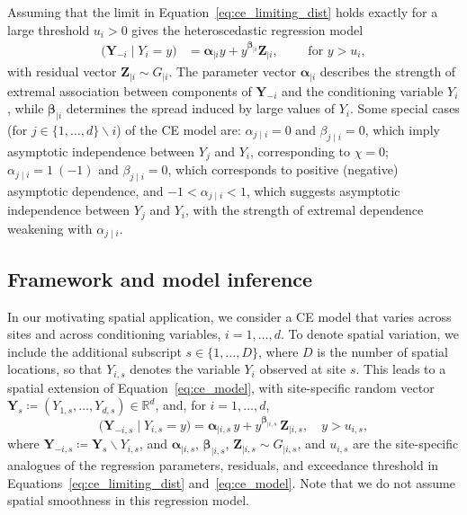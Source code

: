 \documentclass[preprint,12pt,authoryear]{elsarticle}
\begin{document}
Assuming that the limit in Equation~\eqref{eq:ce_limiting_dist} holds exactly for a large threshold $u_i > 0$ gives the heteroscedastic regression model
\begin{align}\label{eq:ce_model}
\bigl(\boldsymbol{Y}_{-i} \mid Y_i = y \bigr) &= \boldsymbol{\alpha}_{\mid i}y + y^{\boldsymbol{\beta}_{\mid i}}\boldsymbol{Z}_{\mid i},\qquad \text{ for } y > u_i,
\end{align}
with residual vector $\boldsymbol{Z}_{\mid i} \sim G_{\mid i}$.
The parameter vector $\boldsymbol{\alpha}_{\mid i}$ describes the strength of extremal association between components of $\boldsymbol{Y}_{-i}$ and the conditioning variable $Y_i$, while $\boldsymbol{\beta}_{\mid i}$ determines the spread induced by large values of $Y_i$. 
Some special cases (for $j\in\{1,\ldots,d\} \backslash i$) of the CE model are:
$\alpha_{j\mid i}=0$ and $\beta_{j\mid i}=0$, which imply asymptotic independence between $Y_j$ and $Y_i$, corresponding to $\chi=0$;
$\alpha_{j\mid i}=1\ ( -1)$ and $\beta_{j\mid i}=0$, which corresponds to positive (negative) asymptotic dependence, and
$-1<\alpha_{j\mid i}<1$, which suggests asymptotic independence between $Y_j$ and $Y_i$, with the strength of extremal dependence weakening with $\alpha_{j \mid i}$. 

\subsection{Framework and model inference}
\label{subsec:ce_setup}

In our motivating spatial application, we consider a CE model that varies across sites and across conditioning variables, $i = 1, \ldots, d$.
To denote spatial variation, we include the additional subscript $s \in \{1, \ldots, D\}$, where $D$ is the number of spatial locations, so that $Y_{i,s}$ denotes the variable $Y_i$ observed at site $s$.
This leads to a spatial extension of Equation~\eqref{eq:ce_model}, with site-specific random vector $\boldsymbol{Y}_{s} \coloneq \left(Y_{1,s}, \ldots, Y_{d,s}\right) \in \mathbb{R}^d$, and, for $i = 1, \ldots, d$,
\begin{equation} \label{eq:ce_model_spat}
  \bigl(\boldsymbol{Y}_{-i, s} \mid Y_{i, s} = y\bigr) 
    = \boldsymbol{\alpha}_{\mid i, s} \, y 
      + y^{\boldsymbol{\beta}_{\mid i, s}} \, \boldsymbol{Z}_{\mid i, s}, 
      \quad y > u_{i, s}, 
\end{equation}
where $\boldsymbol{Y}_{-i, s} \coloneqq \boldsymbol{Y}_{s} \backslash Y_{i, s}$, and $\boldsymbol{\alpha}_{\mid i, s}$, $\boldsymbol{\beta}_{\mid i, s}$, $\boldsymbol{Z}_{\mid i, s} \sim G_{\mid i, s}$, and $u_{i, s}$ are the site-specific analogues of the regression parameters, residuals, and exceedance threshold in Equations~\eqref{eq:ce_limiting_dist} and~\eqref{eq:ce_model}.
Note that we do not assume spatial smoothness in this regression model.
\end{document}
